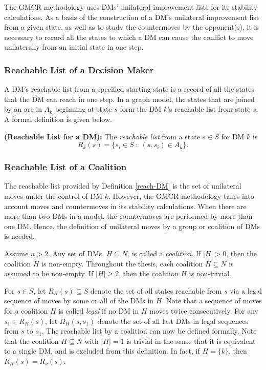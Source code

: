 The GMCR methodology uses DMs' unilateral improvement lists for its stability calculations. As a basis of the construction of a DM's unilateral improvement list from a given state, as well as to study the countermoves by the opponent(s), it is necessary to record all the states to which a DM can cause the conflict to move unilaterally from an initial state in one step.

\subsubsection{Reachable List of a Decision Maker}

A DM's reachable list from a specified starting state is a record of all the states that the DM can reach in one step. In a graph model, the states that are joined by an arc in $A_k$ beginning at state $s$ form the DM $k$'s reachable list from state $s$. A formal definition is given below.
\begin{definition}\label{reach-DM}
\rm {\bf (Reachable List for a DM):} The \emph{reachable list} from a state $s \in S$ for DM $k$ is
$$R_k(s)=\{s_i \in S \; : \; (s, s_i) \in A_k\}.$$
\end{definition}

\subsubsection{Reachable List of a Coalition}

The reachable list provided by Definition \ref{reach-DM} is the set of unilateral moves under the control of DM $k$. However, the GMCR methodology takes into account moves and countermoves in its stability calculations. When there are more than two DMs in a model, the countermoves are performed by more than one DM. Hence, the definition of unilateral moves by a group or coalition of DMs is needed.

Assume $n>2$. Any set of DMs, $H \subseteq N$, is called a \emph{coalition}. If $|H|>0$, then the coalition $H$ is non-empty. Throughout the thesis, each coalition $H \subseteq N$ is assumed to be non-empty. If $|H| \geq 2$, then the coalition $H$ is non-trivial.

For $s \in S$, let $R_H(s) \subseteq S$ denote the set of all states reachable from $s$ via a legal sequence of moves by some or all of the DMs in $H$. Note that a sequence of moves for a coalition $H$ is called \emph{legal} if no DM in $H$ moves twice consecutively. For any $s_1 \in R_H(s)$, let $\Omega_H(s, s_1)$ denote the set of all last DMs in legal sequences from $s$ to $s_1$. The reachable list by a coalition can now be defined formally. Note that the coalition $H \subseteq N$ with $|H|=1$ is trivial in the sense that it is equivalent to a single DM, and is excluded from this definition. In fact, if $H = \{k\}$, then $R_H(s)=R_k(s)$.

